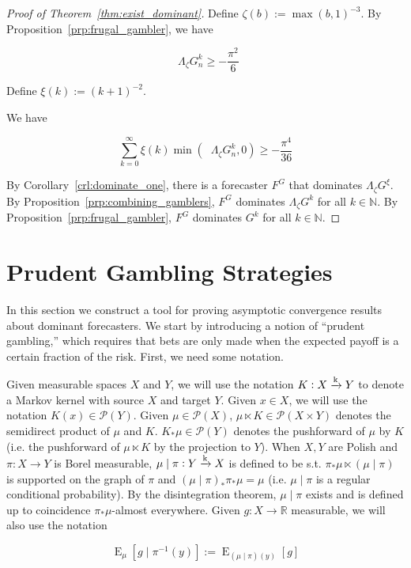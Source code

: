 \documentclass[11pt]{article}
\theoremstyle{definition}
\theoremstyle{plain}
\newcommand{\Nats}{\mathbb{N}}
\newcommand{\Reals}{\mathbb{R}}
\DeclareMathOperator{\E}{E}
\newcommand{\M}{\xrightarrow{\textnormal{k}}}
\newcommand{\PM}{\mathcal{P}}
\DeclareMathOperator{\SVM}{\Sigma V_{\min}}
\newcommand{\Bd}{\Lambda}
\begin{document}
\begin{proof}[Proof of Theorem~\ref{thm:exist_dominant}]

Define $\zeta(b) := \max(b,1)^{-3}$. By Proposition~\ref{prp:frugal_gambler}, we have

\[\SVM \Bd_{\zeta} G^k_n \geq -\frac{\pi^2}{6}\]

Define $\xi(k):=(k+1)^{-2}$.

We have

\[\sum_{k=0}^\infty \xi(k) \min(\SVM \Bd_{\zeta} G^k_n, 0) \geq -\frac{\pi^4}{36} \]

By Corollary~\ref{crl:dominate_one}, there is a forecaster $F^G$ that dominates $\Bd_\zeta G^\xi$. By Proposition~\ref{prp:combining_gamblers}, $F^G$ dominates $\Bd_\zeta G^k$ for all $k \in \Nats$. By Proposition~\ref{prp:frugal_gambler}, $F^G$ dominates $G^k$ for all $k \in \Nats$.
\end{proof}

\section{Prudent Gambling Strategies}
\label{sec:prudent}

In this section we construct a tool for proving asymptotic convergence results about dominant forecasters. We start by introducing a notion of \enquote{prudent gambling,} which requires that bets are only made when the expected payoff is a certain fraction of the risk. First, we need some notation.

Given measurable spaces $X$ and $Y$, we will use the notation $K: X \M Y$ to denote a Markov kernel with source $X$ and target $Y$. Given $x \in X$, we will use the notation $K(x) \in \PM(Y)$. Given $\mu \in \PM(X)$, $\mu \ltimes K \in \PM(X \times Y)$ denotes the semidirect product of $\mu$ and $K$. $K_* \mu \in \PM(Y)$ denotes the pushforward of $\mu$ by $K$ (i.e. the pushforward of $\mu \ltimes K$ by the projection to $Y$). When $X,Y$ are Polish and $\pi: X \rightarrow Y$ is Borel measurable, $\mu \mid \pi: Y \M X$ is defined to be s.t. $\pi_* \mu \ltimes (\mu \mid \pi)$ is supported on the graph of $\pi$ and $(\mu \mid \pi)_* \pi_* \mu = \mu$ (i.e. $\mu \mid \pi$ is a regular conditional probability). By the disintegration theorem, $\mu \mid \pi$ exists and is defined up to coincidence $\pi_* \mu$-almost everywhere. Given $g: X \rightarrow \Reals$ measurable, we will also use the notation 

\begin{equation}
\E_{\mu}[g \mid \pi^{-1}(y)]:=\E_{(\mu \mid \pi)(y)}[g]
\end{equation}
\end{document}
